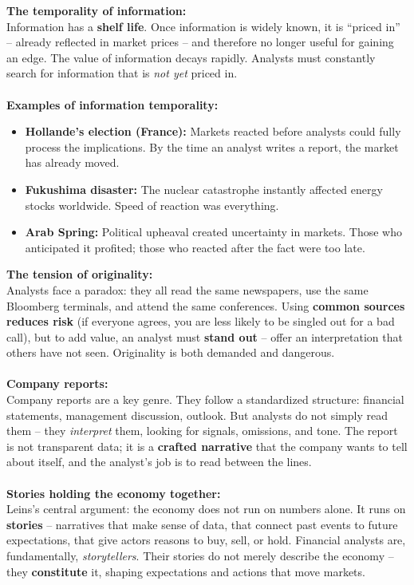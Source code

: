 \documentclass[a4paper,12pt]{article}
\begin{document}
\noindent \textbf{The temporality of information:} \\
\noindent Information has a \textbf{shelf life}. Once information is widely known, it is ``priced in'' -- already reflected in market prices -- and therefore no longer useful for gaining an edge. The value of information decays rapidly. Analysts must constantly search for information that is \emph{not yet} priced in. \\
\\
\noindent \textbf{Examples of information temporality:}
\begin{itemize}
	\item \textbf{Hollande's election (France):} Markets reacted before analysts could fully process the implications. By the time an analyst writes a report, the market has already moved.
	\item \textbf{Fukushima disaster:} The nuclear catastrophe instantly affected energy stocks worldwide. Speed of reaction was everything.
	\item \textbf{Arab Spring:} Political upheaval created uncertainty in markets. Those who anticipated it profited; those who reacted after the fact were too late.
\end{itemize}

\noindent \textbf{The tension of originality:} \\
\noindent Analysts face a paradox: they all read the same newspapers, use the same Bloomberg terminals, and attend the same conferences. Using \textbf{common sources reduces risk} (if everyone agrees, you are less likely to be singled out for a bad call), but to add value, an analyst must \textbf{stand out} -- offer an interpretation that others have not seen. Originality is both demanded and dangerous. \\
\\
\noindent \textbf{Company reports:} \\
\noindent Company reports are a key genre. They follow a standardized structure: financial statements, management discussion, outlook. But analysts do not simply read them -- they \emph{interpret} them, looking for signals, omissions, and tone. The report is not transparent data; it is a \textbf{crafted narrative} that the company wants to tell about itself, and the analyst's job is to read between the lines. \\
\\
\noindent \textbf{Stories holding the economy together:} \\
\noindent Leins's central argument: the economy does not run on numbers alone. It runs on \textbf{stories} -- narratives that make sense of data, that connect past events to future expectations, that give actors reasons to buy, sell, or hold. Financial analysts are, fundamentally, \emph{storytellers}. Their stories do not merely describe the economy -- they \textbf{constitute} it, shaping expectations and actions that move markets. \\
\end{document}
